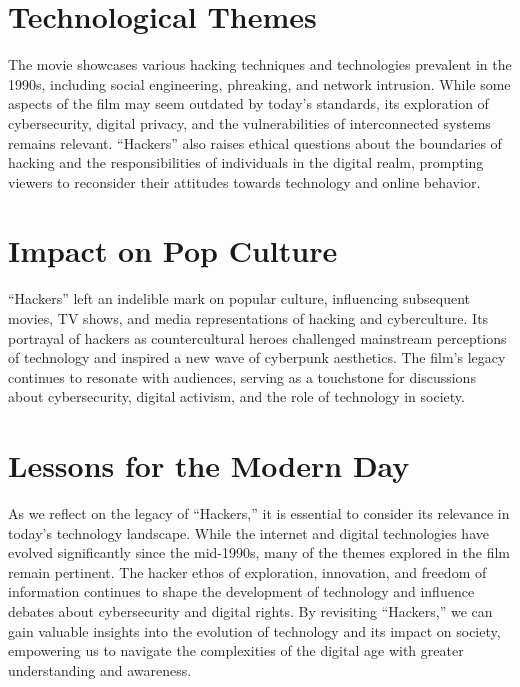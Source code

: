 \documentclass[
  openany]{book}
\begin{document}
\hypertarget{technological-themes}{%
\chapter{Technological Themes}\label{technological-themes}}

The movie showcases various hacking techniques and technologies prevalent in the 1990s, including social engineering, phreaking, and network intrusion. While some aspects of the film may seem outdated by today's standards, its exploration of cybersecurity, digital privacy, and the vulnerabilities of interconnected systems remains relevant. ``Hackers'' also raises ethical questions about the boundaries of hacking and the responsibilities of individuals in the digital realm, prompting viewers to reconsider their attitudes towards technology and online behavior.

\hypertarget{impact-on-pop-culture}{%
\chapter{Impact on Pop Culture}\label{impact-on-pop-culture}}

``Hackers'' left an indelible mark on popular culture, influencing subsequent movies, TV shows, and media representations of hacking and cyberculture. Its portrayal of hackers as countercultural heroes challenged mainstream perceptions of technology and inspired a new wave of cyberpunk aesthetics. The film's legacy continues to resonate with audiences, serving as a touchstone for discussions about cybersecurity, digital activism, and the role of technology in society.

\hypertarget{lessons-for-the-modern-day}{%
\chapter{Lessons for the Modern Day}\label{lessons-for-the-modern-day}}

As we reflect on the legacy of ``Hackers,'' it is essential to consider its relevance in today's technology landscape. While the internet and digital technologies have evolved significantly since the mid-1990s, many of the themes explored in the film remain pertinent. The hacker ethos of exploration, innovation, and freedom of information continues to shape the development of technology and influence debates about cybersecurity and digital rights. By revisiting ``Hackers,'' we can gain valuable insights into the evolution of technology and its impact on society, empowering us to navigate the complexities of the digital age with greater understanding and awareness.
\end{document}
